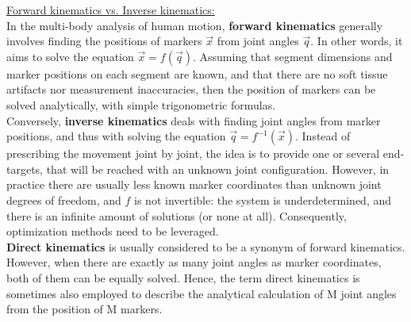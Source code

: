 \noindent\underline{Forward kinematics vs. Inverse kinematics:}\\
In the multi-body analysis of human motion, \textbf{forward kinematics} generally involves finding the positions of markers $\overrightarrow{x}$ from joint angles $\overrightarrow{q}$. In other words, it aims to solve the equation $\overrightarrow{x}=f(\overrightarrow{q})$. Assuming that segment dimensions and marker positions on each segment are known, and that there are no soft tissue artifacts nor measurement inaccuracies, then the position of markers can be solved analytically, with simple trigonometric formulas. \\
Conversely, \textbf{inverse kinematics} deals with finding joint angles from marker positions, and thus with solving the equation $\overrightarrow{q}=f^{-1}(\overrightarrow{x})$. Instead of prescribing the movement joint by joint, the idea is to provide one or several end-targets, that will be reached with an unknown joint configuration. However, in practice there are usually less known marker coordinates than unknown joint degrees of freedom, and $f$ is not invertible: the system is underdetermined, and there is an infinite amount of solutions (or none at all). Consequently, optimization methods need to be leveraged.\\
\textbf{Direct kinematics} is usually considered to be a synonym of forward kinematics. However, when there are exactly as many joint angles as marker coordinates, both of them can be equally solved. Hence, the term direct kinematics is sometimes also employed to describe the analytical calculation of M joint angles from the position of M markers.









